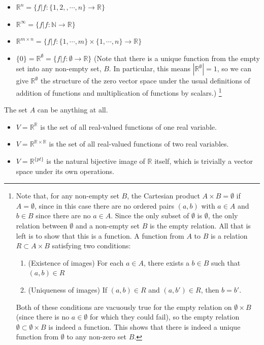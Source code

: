 \documentclass[12pt,letterpaper,reqno]{article}
\numberwithin{equation}{section}
\begin{document}
\begin{itemize}
	\item $\mathbb{R}^n=\{f|f:\{1,2,,\cdots,n\}\to \mathbb{R}\}$ \\
	\item $\mathbb{R}^\infty=\{f|f:\mathbb{N} \to \mathbb{R}\}$ \\
	\item $\mathbb{R}^{m \times n}=\{f|f:\{1,\cdots,m\} \times \{1,\cdots,n\} \to \mathbb{R}\}$
	\item $\{0\}=\mathbb{R}^\emptyset=\{f|f:\emptyset \to \mathbb{R}\}$ (Note that there is a unique function from the empty set into any non-empty set, $B$. In particular, this means $|\mathbb{R}^\emptyset|=1$, so we can give $\mathbb{R}^\emptyset$ the structure of the zero vector space under the usual definitions of addition of functions and multiplication of functions by scalars.) \footnote{Note that, for any non-empty set $B$, the Cartesian product $A \times B=\emptyset$ if $A=\emptyset$, since in this case there are no ordered pairs $(a,b)$ with $a \in A$ and $b \in B$ since there are no $a \in A$. Since the only subset of $\emptyset$ is $\emptyset$, the only relation between $\emptyset$ and a non-empty set $B$ is the empty relation. All that is left is to show that this is a function. A function from $A$ to $B$ is a relation $R \subset A \times B$ satisfying two conditions:
\begin{enumerate}[(1)]
	\item (Existence of images) For each $a \in A$, there exists a $b \in B$ such that $(a,b) \in R$
	\item (Uniqueness of images) If $(a,b) \in R$ and $(a,b') \in R$, then $b=b'$. 
\end{enumerate}
Both of these conditions are vacuously true for the empty relation on $\emptyset \times B$ (since there is no $a \in \emptyset$ for which they could fail), so the empty relation $\emptyset \subset \emptyset \times B$ is indeed a function. This shows that there is indeed a unique function from $\emptyset$ to any non-zero set $B$.}
\end{itemize}

The set $A$ can be anything at all. 
\begin{itemize}
	\item $V=\mathbb{R}^{\mathbb{R}}$ is the set of all real-valued functions of one real variable.
	\item $V=\mathbb{R}^{\mathbb{R} \times \mathbb{R}}$ is the set of all real-valued functions of two real variables.
	\item $V=\mathbb{R}^{\{pt\}}$ is the natural bijective image of $\mathbb{R}$ itself, which is trivially a vector space under its own operations.
\end{itemize}
\end{document}
